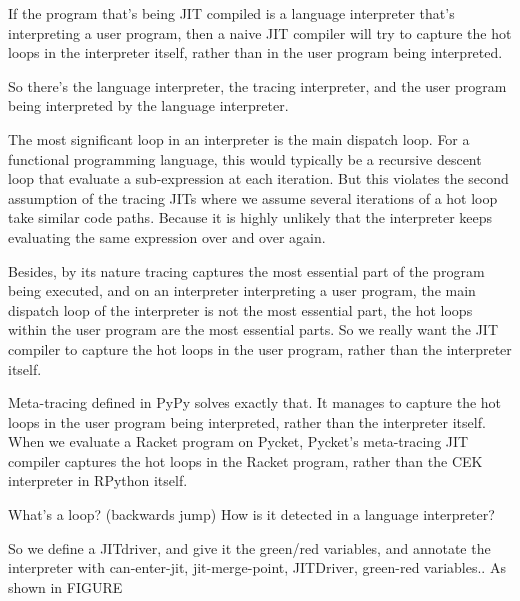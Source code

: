         \begin{paragraph-here}
            If the program that's being JIT compiled is a language interpreter that's interpreting a user program, then a naive JIT compiler will try to capture the hot loops in the interpreter itself, rather than in the user program being interpreted.

            So there's the language interpreter, the tracing interpreter, and the user program being interpreted by the language interpreter.

            The most significant loop in an interpreter is the main dispatch loop. For a functional programming language, this would typically be a recursive descent loop that evaluate a sub-expression at each iteration. But this violates the second assumption of the tracing JITs where we assume several iterations of a hot loop take similar code paths. Because it is highly unlikely that the interpreter keeps evaluating the same expression over and over again.
        \end{paragraph-here}

        \begin{paragraph-here}
            Besides, by its nature tracing captures the most essential part of the program being executed, and on an interpreter interpreting a user program, the main dispatch loop of the interpreter is not the most essential part, the hot loops within the user program are the most essential parts. So we really want the JIT compiler to capture the hot loops in the user program, rather than the interpreter itself.
        \end{paragraph-here}

        \begin{paragraph-here}
            Meta-tracing defined in PyPy \cite{pypy-main} solves exactly that. It manages to capture the hot loops in the user program being interpreted, rather than the interpreter itself. When we evaluate a Racket program on Pycket, Pycket's meta-tracing JIT compiler captures the hot loops in the Racket program, rather than the CEK interpreter in RPython itself.
        \end{paragraph-here}

        \begin{paragraph-here}
            What's a loop? (backwards jump) How is it detected in a language interpreter?
        \end{paragraph-here}

        \begin{paragraph-here}
            So we define a JITdriver, and give it the green/red variables, and annotate the interpreter with  can-enter-jit, jit-merge-point, JITDriver, green-red variables.. As shown in FIGURE
        \end{paragraph-here}

